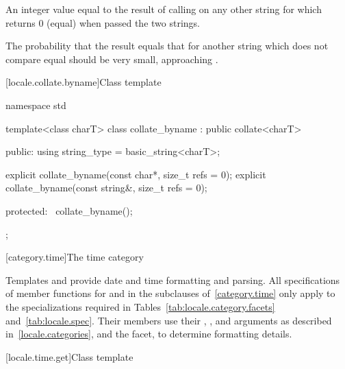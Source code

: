 \begin{itemdescr}
\pnum
\returns
An integer value equal to the result of calling
on any other string for which
returns 0 (equal) when passed the two strings.
\begin{note}
The probability that the result equals that for another string which does
not compare equal should be very small, approaching
.
\end{note}
\end{itemdescr}

[locale.collate.byname]{Class template }

%
\begin{codeblock}
namespace std {
  template<class charT>
    class collate_byname : public collate<charT> {
    public:
      using string_type = basic_string<charT>;

      explicit collate_byname(const char*, size_t refs = 0);
      explicit collate_byname(const string&, size_t refs = 0);

    protected:
      ~collate_byname();
    };
}
\end{codeblock}

[category.time]{The time category}

\pnum
Templates
and
provide date and time formatting and parsing.
All specifications of member functions for
and
in the subclauses of~\ref{category.time} only apply to the
specializations required in Tables~\ref{tab:locale.category.facets}
and~\ref{tab:locale.spec}.
Their members use their
,
,
and
arguments as described in~\ref{locale.categories}, and the
facet, to determine formatting details.

[locale.time.get]{Class template }

